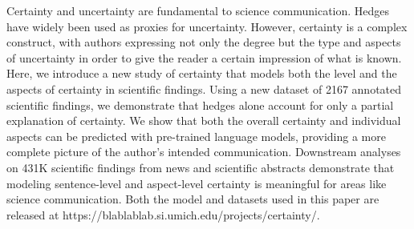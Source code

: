 Certainty and uncertainty  are fundamental to science communication. Hedges have widely been used as proxies for uncertainty. However, certainty is a complex construct, with authors expressing not only the degree but the type and aspects of uncertainty in order to give the reader a certain impression of what is known. Here, we introduce a new study of certainty that models both the level and the aspects of certainty in scientific findings. Using a new dataset of 2167 annotated scientific findings, we demonstrate that hedges alone account for only a partial explanation of certainty. We show that both the overall certainty and individual aspects can be predicted with pre-trained language models, providing a more complete picture of the author's intended communication. Downstream analyses on 431K scientific findings from news and scientific abstracts demonstrate that modeling sentence-level and aspect-level certainty is meaningful for areas like science communication. Both the model and datasets used in this paper are released at https://blablablab.si.umich.edu/projects/certainty/.
